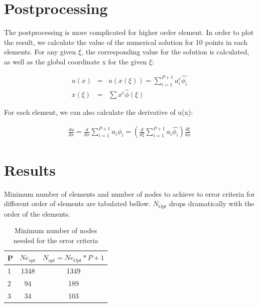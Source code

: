 \documentclass[paper=a4, fontsize=11pt]{article} %
\begin{document}
\section{Postprocessing}
The postprocessing is more complicated for higher order element. In order to plot the result, we calculate the value of the numerical solution for 10 points in each elements. For any given $\xi$, the corresponding value for the solution is calculated, as well as the global coordinate x for the given $\xi$:

\begin{eqnarray}
 u(x) &=& u(x(\xi))=\sum_{i=1}^{P+1} a_i^e \hat{\phi_i}\nonumber\\
 x(\xi) &=& \sum x^e \hat{\phi}(\xi)
 \end{eqnarray} 

For each element, we can also calculate the derivative of u(x):

\begin{eqnarray}
\frac{du}{dx} = \frac{d}{dx} \sum_{i=1}^{P+1} a_i \phi_i = (\frac{d}{d\xi}\sum_{i=1}^{P+1} a_i \hat{\phi_i})\frac{d\xi}{dx}
\end{eqnarray}

\section{Results}

Minimum number of elements and number of nodes to achieve to error criteria for different order of elements are tabulated bellow. $N_{Opt}$ drops dramatically with the order of the elements. 
\begin{table}
\begin{center}
  \begin{tabular}{ l | c | c}
    \hline
    P & $Ne_{opt}$ & $N_{opt} = Ne_{Opt} * P + 1 $\\ \hline
    1 & 1348 & 1349\\ \hline
    2 &  94 & 189\\ \hline
    3 & 34 & 103\\ \hline
    \hline
  \end{tabular}
  \caption{Minimum number of nodes needed for the error criteria}
\end{center}
\end{table}
\end{document}
